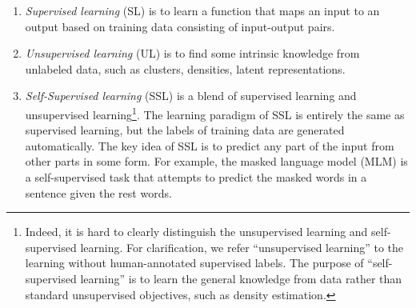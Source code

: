\documentclass[fleqn]{SCYE-arxiv}
\begin{document}
\begin{multicols}{2}
\begin{enumerate}
  \item \textit{Supervised learning} (SL) is to learn a function that maps an input to an output based on training data consisting of input-output pairs.
  \item \textit{Unsupervised learning} (UL) is to find some intrinsic knowledge from unlabeled data, such as clusters, densities, latent representations.
  \item \textit{Self-Supervised learning} (SSL) is a blend of supervised learning and unsupervised learning\footnote{Indeed, it is hard to clearly distinguish the unsupervised learning and self-supervised learning. For clarification, we refer ``unsupervised learning'' to the learning
without human-annotated supervised labels. The purpose of ``self-supervised learning'' is to learn the general knowledge from data rather than standard unsupervised objectives, such as density estimation.}.
The learning paradigm of SSL is entirely the same as supervised learning, but the labels of training data are generated automatically.
The key idea of SSL is to predict any part of the input from other parts in some form. For example, the masked language model (MLM) is a self-supervised task that attempts to predict the masked words in a sentence given the rest words.


\end{enumerate}





\end{multicols}
\end{document}
